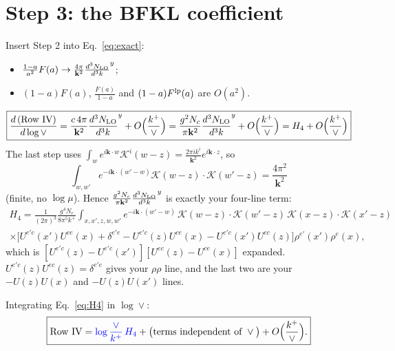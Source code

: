 \documentclass[10pt]{article}
\numberwithin{equation}{section}
\newcommand{\NLO}[1]{\frac{d^3N_{#1}}{d^3k}}
\newcommand{\new}[1]{{\color{blue}#1}}
\begin{document}
\section{Step 3: the BFKL coefficient}
Insert Step 2 into Eq.~\eqref{eq:exact}:
\begin{itemize}
\item $\frac{1-a}{a^2}F(a)\to\frac{4\pi}{\mathbf k^2}\NLO{\rm LO}^{y}$;
\item $(1-a)F(a)$, $\frac{F(a)}{1-a}$ and $(1-a)F^{\rm lp}(a)$ are $O(a^2)$.
\end{itemize}
\begin{equation}
\boxed{\frac{d\,(\text{Row IV})}{d\log\vee}=\frac{c\,4\pi}{\mathbf k^2}\NLO{\rm LO}^{y}+O\Big(\frac{k^+}{\vee}\Big)=\frac{g^2N_c}{\pi\mathbf k^2}\NLO{\rm LO}^{y}+O\Big(\frac{k^+}{\vee}\Big)=H_4+O\Big(\frac{k^+}{\vee}\Big)}\label{eq:H4}
\end{equation}
The last step uses $\int_w e^{i\mathbf k\cdot w}\mathcal K^i(w-z)=\frac{2\pi i k^i}{\mathbf k^2}e^{i\mathbf k\cdot z}$, so
\begin{equation}
\int_{w,w'}e^{-i\mathbf k\cdot(w'-w)}\mathcal K(w-z)\cdot\mathcal K(w'-z)=\frac{4\pi^2}{\mathbf k^2}
\end{equation}
(finite, no $\log\mu$). Hence $\frac{g^2N_c}{\pi\mathbf k^2}\NLO{\rm LO}^{y}$ is exactly your four-line term:
\begin{multline}
H_4=\frac{1}{(2\pi)^{3}}\frac{g^{4}N_c}{8\pi^{5}k^{+}}\int_{x,x',z,w,w'}e^{-i\mathbf k\cdot(w'-w)}\,\mathcal K(w-z)\cdot\mathcal K(w'-z)\,\mathcal K(x-z)\cdot\mathcal K(x'-z)\\
\times\Big[U^{e'c}(x')U^{ce}(x)+\delta^{e'e}-U^{e'c}(z)U^{ce}(x)-U^{e'c}(x')U^{ec}(z)\Big]\rho^{e'}(x')\rho^e(x),
\end{multline}
which is $[U^{e'c}(z)-U^{e'c}(x')][U^{ec}(z)-U^{ce}(x)]$ expanded. $U^{e'c}(z)U^{ec}(z)=\delta^{e'e}$ gives your $\rho\rho$ line, and the last two are your $-U(z)U(x)$ and $-U(z)U(x')$ lines.

Integrating Eq.~\eqref{eq:H4} in $\log\vee$:
\begin{equation}
\boxed{\text{Row IV}=\new{\log\frac{\vee}{k^+}\,H_4}+\big(\text{terms independent of }\vee\big)+O\Big(\frac{k^+}{\vee}\Big).}
\end{equation}
\end{document}
